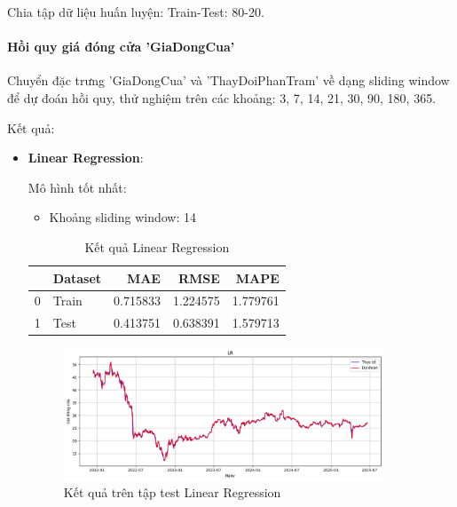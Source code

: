     Chia tập dữ liệu huấn luyện: Train-Test: 80-20.

    \paragraph{Hồi quy giá đóng cửa 'GiaDongCua'}
    \leavevmode

    Chuyển đặc trưng 'GiaDongCua' và 'ThayDoiPhanTram' về dạng sliding window để dự đoán hồi quy, thử nghiệm trên các khoảng: 3, 7, 14, 21, 30, 90, 180, 365.

    Kết quả:
    \begin{itemize}
        \item \textbf{Linear Regression}: 
        
            Mô hình tốt nhất:
            \begin{itemize}
                \item Khoảng sliding window: 14
            \end{itemize}

            \begin{table}[htbp]
            \centering
            \caption{Kết quả Linear Regression}
            \label{tab:stock-close-lireg}
            \begin{tabular}{llrrr}
            \hline
             & Dataset & MAE & RMSE & MAPE \\
            \hline
            0 & Train & 0.715833 & 1.224575 & 1.779761 \\
            1 & Test & 0.413751 & 0.638391 & 1.579713 \\
            \hline
            \end{tabular}
            \end{table}
  
            
            \FloatBarrier

            \begin{figure}[htp]
                \centering
                \includegraphics[width=0.90\textwidth]{images/TS_stock_pred_cmp_LR.png}
                \caption{Kết quả trên tập test Linear Regression}
                \label{fig:TS_stock_pred_cmp_LR}
            \end{figure}
        

\end{itemize}
